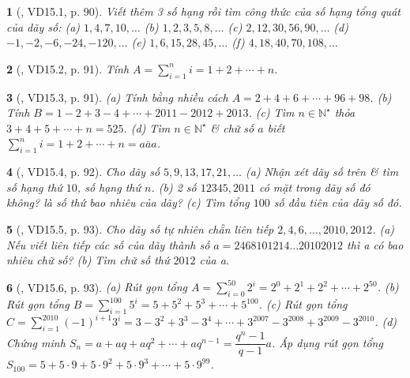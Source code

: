 \documentclass{article}
\newtheorem{baitoan}{}
\begin{document}
\begin{baitoan}[\cite{TLCT_THCS_Toan_6_so_hoc}, VD15.1, p. 90]
	Viết thêm 3 số hạng rồi tìm công thức của số hạng tổng quát của dãy số: (a) $1,4,7,10,\ldots$ (b) $1,2,3,5,8,\ldots$ (c) $2,12,30,56,90,\ldots$ (d) $-1,-2,-6,-24,-120,\ldots$ (e) $1,6,15,28,45,\ldots$ (f) $4,18,40,70,108,\ldots$
\end{baitoan}

\begin{baitoan}[\cite{TLCT_THCS_Toan_6_so_hoc}, VD15.2, p. 91]
	Tính $A = \sum_{i=1}^n i = 1 + 2 + \cdots + n$.
\end{baitoan}

\begin{baitoan}[\cite{TLCT_THCS_Toan_6_so_hoc}, VD15.3, p. 91]
	(a) Tính bằng nhiều cách $A = 2 + 4 + 6 + \cdots + 96 + 98$. (b) Tính $B = 1 - 2 + 3 - 4 + \cdots + 2011 - 2012 + 2013$. (c) Tìm $n\in\mathbb{N}^\star$ thỏa $3 + 4 + 5 + \cdots + n = 525$. (d) Tìm $n\in\mathbb{N}^\star$ \& chữ số $a$ biết $\sum_{i=1}^n i = 1 + 2 + \cdots + n = \overline{aaa}$.
\end{baitoan}

\begin{baitoan}[\cite{TLCT_THCS_Toan_6_so_hoc}, VD15.4, p. 92]
	Cho dãy số $5,9,13,17,21,\ldots$ (a) Nhận xét dãy số trên \& tìm số hạng thứ $10$, số hạng thứ $n$. (b) 2 số $12345,2011$ có mặt trong dãy số đó không? là số thứ bao nhiêu của dãy? (c) Tìm tổng $100$ số đầu tiên của dãy số đó.
\end{baitoan}

\begin{baitoan}[\cite{TLCT_THCS_Toan_6_so_hoc}, VD15.5, p. 93]
	Cho dãy số tự nhiên chẵn liên tiếp $2,4,6,\ldots,2010,2012$. (a) Nếu viết liên tiếp các số của dãy thành số $a = 2468101214\ldots20102012$ thì a có bao nhiêu chữ số? (b) Tìm chữ số thứ $2012$ của a.
\end{baitoan}

\begin{baitoan}[\cite{TLCT_THCS_Toan_6_so_hoc}, VD15.6, p. 93]
	(a) Rút gọn tổng $A = \sum_{i=0}^{50} 2^i = 2^0 + 2^1 + 2^2 + \cdots + 2^{50}$. (b) Rút gọn tổng $B = \sum_{i=1}^{100} 5^i = 5 + 5^2 + 5^3 + \cdots + 5^{100}$. (c) Rút gọn tổng $C = \sum_{i=1}^{2010} (-1)^{i+1}3^i = 3 - 3^2 + 3^3 - 3^4 + \cdots + 3^{2007} - 3^{2008} + 3^{2009} - 3^{2010}$. (d) Chứng minh $S_n =  a + aq+ aq^2 + \cdots + aq^{n-1} = \dfrac{q^n - 1}{q - 1}a$. Áp dụng rút gọn tổng $S_{100} = 5 + 5\cdot9 + 5\cdot9^2 + 5\cdot9^3 + \cdots + 5\cdot9^{99}$.
\end{baitoan}
\end{document}
